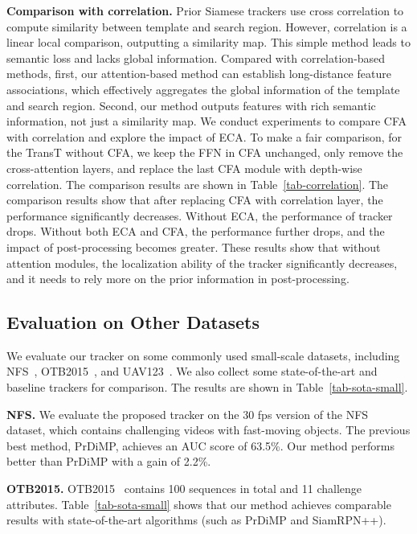 \documentclass[final]{cvpr}
\newcommand{\ignore}[1]{}
\begin{document}
{\noindent \textbf{Comparison with correlation. }} 
Prior Siamese trackers use cross correlation to compute similarity between template and search region.  However, correlation is a linear local comparison, outputting a similarity map. This simple method leads to semantic loss and lacks global information.
Compared with correlation-based methods, first, our attention-based method can establish long-distance feature associations, which effectively aggregates the global information of the template and search region. Second, our method outputs features with rich semantic information, not just a similarity map. 
We conduct experiments to compare CFA with correlation and explore the impact of ECA. To make a fair comparison, for the TransT without CFA, we keep the FFN in CFA unchanged, only remove the cross-attention layers, and replace the last CFA module with depth-wise correlation. The comparison results are shown in Table~\ref{tab-correlation}.
The comparison results show that after replacing CFA with correlation layer, the performance significantly decreases.
Without ECA, the performance of tracker drops. Without both ECA and CFA, the performance further drops, and the impact of post-processing becomes greater.
These results show that without attention modules, the localization ability of the tracker significantly decreases, and it needs to rely more on the prior information in post-processing.







\subsection{Evaluation on Other Datasets} 

\ignore{In Table~\ref{tab-sota-small},} 
We evaluate our tracker on some commonly used small-scale datasets, 
including NFS~\cite{NFS}, OTB2015~\cite{OTB2015}, and UAV123~\cite{UAV}. 
We also collect some state-of-the-art and baseline trackers for comparison. The results are shown in Table~\ref{tab-sota-small}.

{\noindent \textbf{NFS. }}We evaluate the proposed tracker on the 30 fps version of the 
NFS~\cite{NFS} dataset, which contains challenging videos with fast-moving objects. 
The previous best method, PrDiMP, achieves an AUC score of 63.5\%. 
Our method performs better than PrDiMP with a gain of 2.2\%.

{\noindent \textbf{OTB2015. }}OTB2015~\cite{OTB2015} contains 100 
sequences in total and 11 challenge attributes.
Table~\ref{tab-sota-small} shows that our method achieves comparable results with state-of-the-art algorithms (such as PrDiMP and SiamRPN++).
\end{document}
